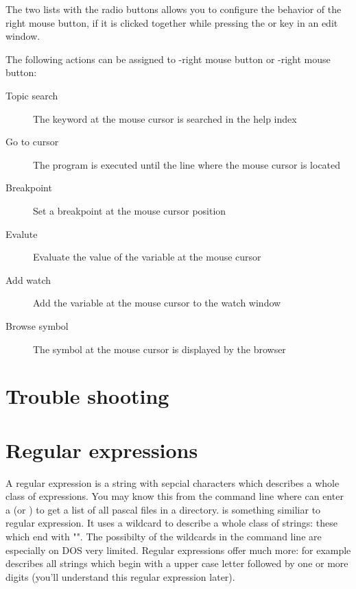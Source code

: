 The two lists with the radio buttons allows you
to configure the behavior of the
right mouse button, if it is clicked together while
pressing the  or
 key in an edit window.

The following actions can be assigned to -right mouse button or
-right mouse button:

\begin{description}
\item [Topic search] The keyword at the mouse cursor is searched in the
help index
\item [Go to cursor] The program is executed until the line where
the mouse cursor is located
\item [Breakpoint] Set a breakpoint at the mouse cursor position
\item [Evalute] Evaluate the value of the variable at the mouse
cursor
\item [Add watch] Add the variable at the mouse cursor to the
watch window
\item [Browse symbol] The symbol at the mouse cursor is displayed
by the browser
\end{description}


\section{Trouble shooting}

\section{Regular expressions}
\label{se:regexpr}
A regular expression is a string with sepcial characters which describes 
a whole class of expressions. You may know this from the command line
where can enter a  (or ) to get a list
of all pascal files in a directory.  is something 
similiar to regular expression. It uses a wildcard to describe a whole 
class of strings: these which end with "". The possibilty 
of the wildcards in the command line are especially on DOS very limited. 
Regular expressions offer much more: for example \file{[A-Z][0-9]+} 
describes all strings which begin with a upper case letter followed by
one or more digits (you'll understand this regular expression later).

